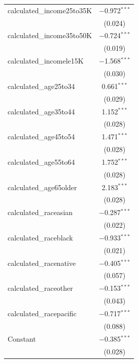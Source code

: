 \documentclass[11pt,a4paper,oldfontcommands]{memoir}
\begin{document}
{\begin{small}
\begin{longtable}[c]{lc}
 calculated\_income25to35K & $-$0.972$^{***}$ \\ 
  & (0.024) \\ 
 
 calculated\_income35to50K & $-$0.724$^{***}$ \\ 
  & (0.019) \\ 
 
 calculated\_incomele15K & $-$1.568$^{***}$ \\ 
  & (0.030) \\ 
 
 calculated\_age25to34 & 0.661$^{***}$ \\ 
  & (0.029) \\ 
 
 calculated\_age35to44 & 1.152$^{***}$ \\ 
  & (0.028) \\ 
 
 calculated\_age45to54 & 1.471$^{***}$ \\ 
  & (0.028) \\ 
 
 calculated\_age55to64 & 1.752$^{***}$ \\ 
  & (0.028) \\ 
 
 calculated\_age65older & 2.183$^{***}$ \\ 
  & (0.028) \\ 
 
 calculated\_raceasian & $-$0.287$^{***}$ \\ 
  & (0.022) \\ 
 
 calculated\_raceblack & $-$0.933$^{***}$ \\ 
  & (0.021) \\ 
 
 calculated\_racenative & $-$0.405$^{***}$ \\ 
  & (0.057) \\ 
 
 calculated\_raceother & $-$0.153$^{***}$ \\ 
  & (0.043) \\ 
 
 calculated\_racepacific & $-$0.717$^{***}$ \\ 
  & (0.088) \\ 
 
 Constant & $-$0.385$^{***}$ \\ 
  & (0.028) \\ 
 

\end{longtable}
\end{small}}
\end{document}
